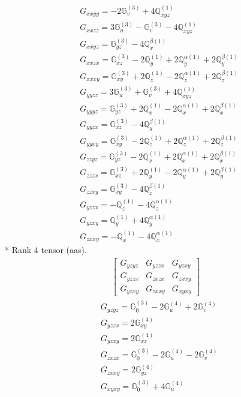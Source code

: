 \documentclass[fleqn,8pt,landscape]{jsarticle}
\begin{document}
\begin{align*}
& G_{xxyy} = - 2 \mathbb{G}_{v}^{(3)} + 4 \mathbb{Q}_{xyz}^{(1)} \\
& G_{xxzz} = 3 \mathbb{G}_{u}^{(3)} - \mathbb{G}_{v}^{(3)} - 4 \mathbb{Q}_{xyz}^{(1)} \\
& G_{xxyz} = \mathbb{G}_{yz}^{(3)} - 4 \mathbb{Q}_{x}^{\beta(1)} \\
& G_{xxzx} = \mathbb{G}_{xz}^{(3)} - 2 \mathbb{Q}_{y}^{(1)} + 2 \mathbb{Q}_{y}^{\alpha(1)} + 2 \mathbb{Q}_{y}^{\beta(1)} \\
& G_{xxxy} = \mathbb{G}_{xy}^{(3)} + 2 \mathbb{Q}_{z}^{(1)} - 2 \mathbb{Q}_{z}^{\alpha(1)} + 2 \mathbb{Q}_{z}^{\beta(1)} \\
& G_{yyzz} = 3 \mathbb{G}_{u}^{(3)} + \mathbb{G}_{v}^{(3)} + 4 \mathbb{Q}_{xyz}^{(1)} \\
& G_{yyyz} = \mathbb{G}_{yz}^{(3)} + 2 \mathbb{Q}_{x}^{(1)} - 2 \mathbb{Q}_{x}^{\alpha(1)} + 2 \mathbb{Q}_{x}^{\beta(1)} \\
& G_{yyzx} = \mathbb{G}_{xz}^{(3)} - 4 \mathbb{Q}_{y}^{\beta(1)} \\
& G_{yyxy} = \mathbb{G}_{xy}^{(3)} - 2 \mathbb{Q}_{z}^{(1)} + 2 \mathbb{Q}_{z}^{\alpha(1)} + 2 \mathbb{Q}_{z}^{\beta(1)} \\
& G_{zzyz} = \mathbb{G}_{yz}^{(3)} - 2 \mathbb{Q}_{x}^{(1)} + 2 \mathbb{Q}_{x}^{\alpha(1)} + 2 \mathbb{Q}_{x}^{\beta(1)} \\
& G_{zzzx} = \mathbb{G}_{xz}^{(3)} + 2 \mathbb{Q}_{y}^{(1)} - 2 \mathbb{Q}_{y}^{\alpha(1)} + 2 \mathbb{Q}_{y}^{\beta(1)} \\
& G_{zzxy} = \mathbb{G}_{xy}^{(3)} - 4 \mathbb{Q}_{z}^{\beta(1)} \\
& G_{yzzx} = - \mathbb{Q}_{z}^{(1)} - 4 \mathbb{Q}_{z}^{\alpha(1)} \\
& G_{yzxy} = \mathbb{Q}_{y}^{(1)} + 4 \mathbb{Q}_{y}^{\alpha(1)} \\
& G_{zxxy} = - \mathbb{Q}_{x}^{(1)} - 4 \mathbb{Q}_{x}^{\alpha(1)}
\end{align*}
* Rank 4 tensor (aas).
\begin{align*}
\begin{bmatrix} G_{yzyz} & G_{yzzx} & G_{yzxy} \\ G_{yzzx} & G_{zxzx} & G_{zxxy} \\ G_{yzxy} & G_{zxxy} & G_{xyxy} \end{bmatrix}
\end{align*}
\begin{align*}
& G_{yzyz} = \mathbb{G}_{0}^{(3)} - 2 \mathbb{G}_{u}^{(4)} + 2 \mathbb{G}_{v}^{(4)} \\
& G_{yzzx} = 2 \mathbb{G}_{xy}^{(4)} \\
& G_{yzxy} = 2 \mathbb{G}_{xz}^{(4)} \\
& G_{zxzx} = \mathbb{G}_{0}^{(3)} - 2 \mathbb{G}_{u}^{(4)} - 2 \mathbb{G}_{v}^{(4)} \\
& G_{zxxy} = 2 \mathbb{G}_{yz}^{(4)} \\
& G_{xyxy} = \mathbb{G}_{0}^{(3)} + 4 \mathbb{G}_{u}^{(4)}
\end{align*}
\end{document}
